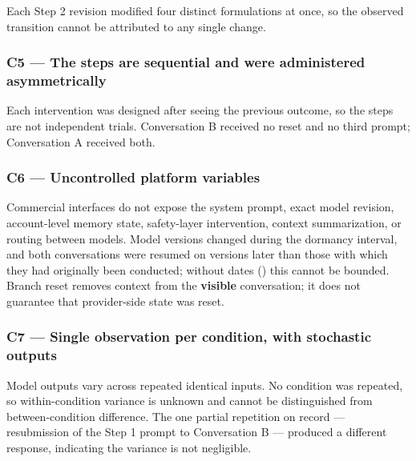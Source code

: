 Each Step 2 revision modified four distinct formulations at once, so the observed transition cannot be attributed to any single change.


\subsubsection*{C5 — The steps are sequential and were administered asymmetrically}
\label{sec:en:x-c5-the-steps-are-sequential-and-were-adm}

Each intervention was designed after seeing the previous outcome, so the steps are not independent trials. Conversation B received no reset and no third prompt; Conversation A received both.


\subsubsection*{C6 — Uncontrolled platform variables}
\label{sec:en:x-c6-uncontrolled-platform-variables}

Commercial interfaces do not expose the system prompt, exact model revision, account-level memory state, safety-layer intervention, context summarization, or routing between models. Model versions changed during the dormancy interval, and both conversations were resumed on versions later than those with which they had originally been conducted; without dates () this cannot be bounded. Branch reset removes context from the \textbf{visible} conversation; it does not guarantee that provider-side state was reset.


\subsubsection*{C7 — Single observation per condition, with stochastic outputs}
\label{sec:en:x-c7-single-observation-per-condition-with}

Model outputs vary across repeated identical inputs. No condition was repeated, so within-condition variance is unknown and cannot be distinguished from between-condition difference. The one partial repetition on record — resubmission of the Step 1 prompt to Conversation B — produced a different response, indicating the variance is not negligible.


